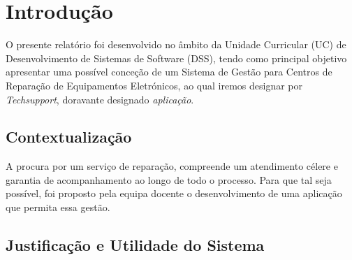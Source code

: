 \documentclass[a4paper,12pt]{scrreprt}
\begin{document}
\pagebreak



\renewcommand{\contentsname}{Índice}

\tableofcontents

\pagebreak

\listoffigures

\pagebreak







\chapter{Introdução}
O presente relatório foi desenvolvido no âmbito da Unidade Curricular (UC) de Desenvolvimento de Sistemas de Software (DSS),
tendo como principal objetivo apresentar uma possível conceção de um Sistema de Gestão para Centros de Reparação de Equipamentos Eletrónicos, ao qual iremos designar por \textit{Techsupport}, 
doravante designado \textit{aplicação}.

\section{Contextualização}
A procura por um serviço de reparação, compreende um atendimento célere e garantia de acompanhamento ao longo de todo o processo.
Para que tal seja possível, foi proposto pela equipa docente o desenvolvimento de uma aplicação que permita essa gestão.

\section{Justificação e Utilidade do Sistema}
\end{document}
